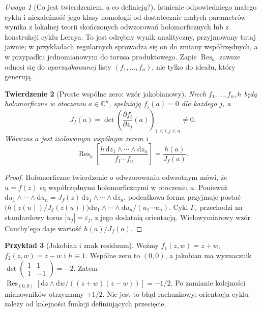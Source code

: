 \documentclass[11pt,a4paper,openany]{report}
\numberwithin{equation}{section}
\theoremstyle{plain}
\newtheorem{twierdzenie}{Twierdzenie}[section]
\theoremstyle{definition}
\newtheorem{przyklad}[twierdzenie]{Przykład}
\theoremstyle{remark}
\newtheorem{uwaga}[twierdzenie]{Uwaga}
\newcommand{\C}{\mathbb C}
\begin{document}
\begin{uwaga}[Co jest twierdzeniem, a co definicją?]
Istnienie odpowiedniego małego cyklu i niezależność jego
klasy homologii od dostatecznie małych parametrów wynika
z lokalnej teorii skończonych odwzorowań holomorficznych
lub z konstrukcji cyklu Leraya. To jest odrębny wynik
analityczny, przyjmowany tutaj jawnie; w przykładach
regularnych sprowadza się on do zmiany współrzędnych,
a w przypadku jednomianowym do torusa produktowego.
Zapis $\operatorname{Res}_a$ zawsze odnosi się do \emph{uporządkowanej}
listy $(f_1,\ldots,f_n)$, nie tylko do ideału, który generują.
\end{uwaga}

\begin{twierdzenie}[Proste wspólne zero: wzór jakobianowy]
\label{tw:ga4-jac-res}
Niech $f_1,\ldots,f_n,h$ będą holomorficzne w otoczeniu
$a\in\C^n$, spełniają $f_j(a)=0$ dla każdego $j$, a
\[
J_f(a)=\det\left(\frac{\partial f_i}{\partial z_j}(a)
\right)_{1\le i,j\le n}\ne0.
\]
Wówczas $a$ jest izolowanym wspólnym zerem i
\[
\operatorname{Res}_a\!\left[
\frac{h\,\mathrm dz_1\wedge\cdots\wedge\mathrm dz_n}
{f_1\cdots f_n}\right]=\frac{h(a)}{J_f(a)}.
\]
\end{twierdzenie}
\begin{proof}
Holomorficzne twierdzenie o odwzorowaniu odwrotnym
mówi, że $u=f(z)$ są współrzędnymi holomorficznymi
w otoczeniu $a$. Ponieważ
$\mathrm du_1\wedge\cdots\wedge\mathrm du_n
=J_f(z)\,\mathrm dz_1\wedge\cdots\wedge\mathrm dz_n$,
podcałkowa forma przyjmuje postać
$\bigl(h(z(u))/J_f(z(u))\bigr)\mathrm du_1\wedge\cdots
\wedge\mathrm du_n/(u_1\cdots u_n)$.
Cykl $\Gamma_\varepsilon$ przechodzi na standardowy torus
$|u_j|=\varepsilon_j$, z jego dodatnią orientacją.
Wielowymiarowy wzór Cauchy'ego daje wartość
$h(a)/J_f(a)$.
\end{proof}

\begin{przyklad}[Jakobian i znak residuum]
Weźmy $f_1(z,w)=z+w$, $f_2(z,w)=z-w$ i $h\equiv1$.
Wspólne zero to $(0,0)$, a jakobian ma wyznacznik
$\det\begin{pmatrix}1&1\\1&-1\end{pmatrix}=-2$.
Zatem
$\operatorname{Res}_{(0,0)}[\mathrm dz\wedge\mathrm dw/
((z+w)(z-w))]=-1/2$.
Po zamianie kolejności mianowników otrzymamy $+1/2$.
Nie jest to błąd rachunkowy: orientacja cyklu zależy od
kolejności funkcji definiujących przecięcie.
\end{przyklad}
\end{document}

